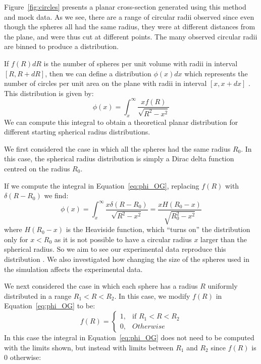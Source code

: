 \documentclass[journal]{IEEEtran}
\begin{document}
Figure~\ref{fig:circles} presents a planar cross-section generated using this
method and mock data. As we see, there are a range of circular radii observed
since even though the spheres all had the same radius, they were at different
distances from the plane, and were thus cut at different points. The many
observed circular radii are binned to produce a distribution.

If $f(R)dR$ is the number of spheres per unit volume with radii in interval $[R,
R + dR]$, then we can define a distribution $\phi(x)dx$ which represents the
number of circles per unit area on the plane with radii in interval $[x,
x+dx]$ \cite{Kiderlen2011}. This distribution is given by:
\begin{equation}
\phi(x) = \int_{x}^{\infty}\frac{xf(R)}{\sqrt{R^2 - x^2}}
\label{eq:phi_OG}
\end{equation}
We can compute this integral to obtain a theoretical planar distribution for
different starting spherical radius distributions.

We first considered the case in which all the spheres had the same radius
$R_0$. In this case, the spherical radius distribution is simply a Dirac delta
function centred on the radius $R_0$.

If we compute the integral in Equation~\ref{eq:phi_OG}, replacing $f(R)$ with
$\delta(R-R_0)$ we find:
\begin{equation}
\phi(x) = \int_{x}^{\infty}\frac{x\delta(R-R_0)}{\sqrt{R^2 - x^2}} =
\frac{xH(R_0-x)}{\sqrt{R_0^2-x^2}}
\label{eq:phi_constant}
\end{equation}
where $H(R_0 - x)$ is the Heaviside function, which ``turns on'' the
distribution only for $x < R_0$ as it is not possible to have a circular radius
$x$ larger than the spherical radius. So we aim to see our experimental data
reproduce this distribution \cite{Kong2005}. We also investigated how changing
the size of the spheres used in the simulation affects the experimental data.

We next considered the case in which each sphere has a radius $R$ uniformly
distributed in a range $R_1 < R < R_2$. In this case, we modify $f(R)$ in
Equation~\ref{eq:phi_OG} to be:
\begin{equation*}
  f(R) =
  \begin{cases}
    1,& \text{if } R_1 < R < R_2\\
    0,& \text{} Otherwise
  \end{cases}
\end{equation*}
In this case the integral in Equation~\ref{eq:phi_OG} does not need to be
computed with the limits shown, but instead with limits between $R_1$ and $R_2$
since $f(R)$ is 0 otherwise:
\end{document}
